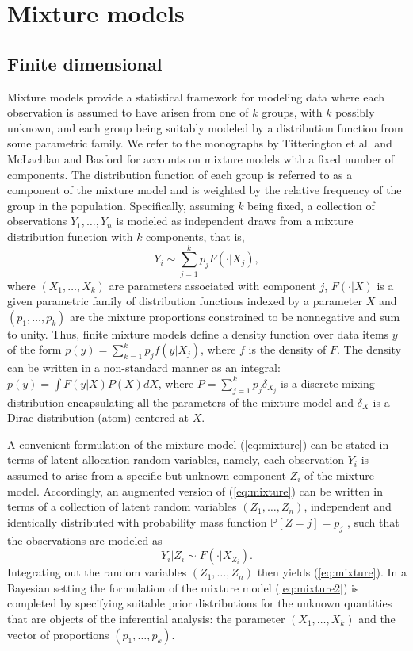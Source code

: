 \section{Mixture models} \label{mixture_models}
\subsection{Finite dimensional}
Mixture models provide a statistical framework for modeling data where each observation is assumed to have arisen from one of $k$ groups, with $k$ possibly unknown, and each group being suitably modeled by a distribution function from some parametric family. We refer to the monographs by Titterington et al. \cite{titterington_85} and McLachlan and Basford \cite{mclachlan_basford88} for accounts on mixture models with a fixed number of components. The distribution function of each group is referred to as a component of the mixture model and is weighted by the relative frequency of the group in the population. Specifically, assuming $k$ being fixed, a collection of observations $Y_1,\dots,Y_n$ is modeled as independent draws from a mixture distribution function with $k$ components, that is,
\begin{equation} \label{eq:mixture}
Y_i \sim \sum_{j=1}^k{p_j F(\cdot|X_j)},
\end{equation}
where $(X_1,\dots,X_k)$ are parameters associated with component $j$, $F(\cdot|X)$ is a given parametric family of distribution functions indexed by a parameter $X$ and
$(p_1, \dots, p_k)$ are the mixture proportions constrained to be nonnegative and sum to unity.
Thus, finite mixture models define a density function over data items $y$ of the form $p(y) = \sum_{k=1}^k p_j f(y|X_j)$, where $f$ is the density of $F$. The density can be written in a non-standard manner as an integral: $p(y) = \int F(y|X) P(X)dX$, where $P = \sum_{j=1}^k p_j \delta_{X_j}$ is a discrete mixing distribution encapsulating all the parameters of the mixture model and $\delta_{X}$ is a Dirac distribution (atom) centered at $X$.

A convenient formulation of the mixture model (\ref{eq:mixture}) can be stated in terms of latent allocation random variables, namely, each observation $Y_i$ is assumed to arise from a specific but unknown component $Z_i$ of the mixture model. Accordingly, an augmented version of (\ref{eq:mixture}) can be written in terms of a collection of latent random variables $(Z_1, \dots , Z_n)$, independent and identically distributed with probability mass function $\mathbb{P}[Z = j] = p_j$ , such that the observations are modeled as
\begin{equation} \label{eq:mixture2}
Y_i|Z_i \sim F(\cdot|X_{Z_i}).
\end{equation}
Integrating out the random variables $(Z_1, \dots , Z_n)$ then yields (\ref{eq:mixture}). In a Bayesian setting the formulation of the mixture model (\ref{eq:mixture2}) is completed by specifying suitable prior distributions for the unknown quantities that are objects of the inferential analysis: the parameter $(X_1, \dots, X_k)$ and the vector of proportions $(p_1, \dots, p_k)$.


